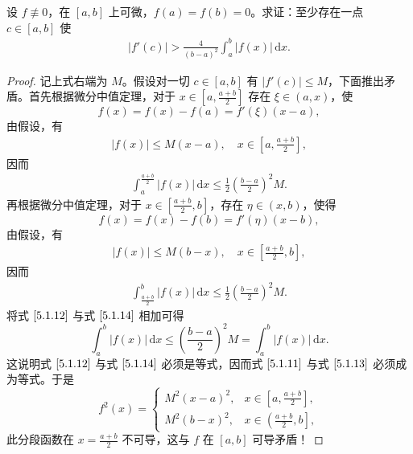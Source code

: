 \documentclass[../../main.tex]{subfiles}
\begin{document}
\begin{example}
设 \( f \not\equiv 0 \)，在 \( [a,b] \) 上可微，\( f(a) = f(b) = 0 \)。求证：至少存在一点 \( c \in [a,b] \) 使
\begin{align}
|f'(c)| > \frac{4}{(b - a)^2} \int_{a}^{b} |f(x)| \, \mathrm{d}x. \label{5.1.10}
\end{align}
\end{example}
\begin{proof}
记上式右端为 \( M \)。假设对一切 \( c \in [a,b] \) 有 \( |f'(c)| \leqslant M \)，下面推出矛盾。首先根据微分中值定理，对于 \( x \in \left[ a, \frac{a + b}{2} \right] \) 存在 \( \xi \in (a,x) \)，使
\[
f(x) = f(x) - f(a) = f'(\xi)(x - a),
\]
由假设，有
\begin{align}
|f(x)| \leqslant M(x - a), \quad x \in \left[ a, \frac{a + b}{2} \right], \label{5.1.11}
\end{align}
因而
\begin{align}
\int_{a}^{\frac{a + b}{2}} |f(x)| \, \mathrm{d}x \leqslant \frac{1}{2} \left( \frac{b - a}{2} \right)^2 M. \label{5.1.12}
\end{align}
再根据微分中值定理，对于 \( x \in \left[ \frac{a + b}{2}, b \right] \)，存在 \( \eta \in (x,b) \)，使得
\[
f(x) = f(x) - f(b) = f'(\eta)(x - b),
\]
由假设，有
\begin{align}
|f(x)| \leqslant M(b - x), \quad x \in \left[ \frac{a + b}{2}, b \right], \label{5.1.13}
\end{align}
因而
\begin{align}
\int_{\frac{a + b}{2}}^{b} |f(x)| \, \mathrm{d}x \leqslant \frac{1}{2} \left( \frac{b - a}{2} \right)^2 M. \label{5.1.14}
\end{align}
将式 \(\eqref{5.1.12}\) 与式 \(\eqref{5.1.14}\) 相加可得
\[
\int_{a}^{b} |f(x)| \, \mathrm{d}x \leqslant \left( \frac{b - a}{2} \right)^2 M = \int_{a}^{b} |f(x)| \, \mathrm{d}x.
\]
这说明式 \(\eqref{5.1.12}\) 与式 \(\eqref{5.1.14}\) 必须是等式，因而式 \(\eqref{5.1.11}\) 与式 \(\eqref{5.1.13}\) 必须成为等式。于是
\[
f^2(x) = 
\begin{cases} 
M^2(x - a)^2, & x \in \left[ a, \frac{a + b}{2} \right], \\
M^2(b - x)^2, & x \in \left( \frac{a + b}{2}, b \right], 
\end{cases}
\]
此分段函数在 \( x = \frac{a + b}{2} \) 不可导，这与 \( f \) 在 \([a,b]\) 可导矛盾！
\end{proof}
\end{document}
